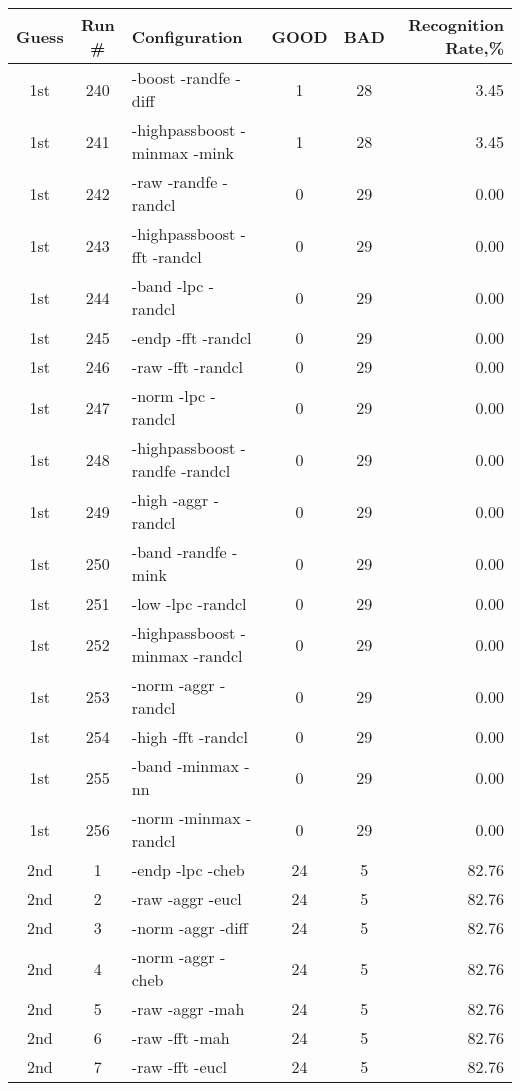 \begin{table}
\begin{minipage}[b]{\textwidth}
\centering
\begin{tabular}{|c|c|l|c|c|r|} \hline
Guess & Run \# & Configuration & GOOD & BAD & Recognition Rate,\%\\ \hline\hline
1st & 240 & -boost -randfe -diff  & 1 & 28 & 3.45\\ \hline
1st & 241 & -highpassboost -minmax -mink  & 1 & 28 & 3.45\\ \hline
1st & 242 & -raw -randfe -randcl  & 0 & 29 & 0.00\\ \hline
1st & 243 & -highpassboost -fft -randcl  & 0 & 29 & 0.00\\ \hline
1st & 244 & -band -lpc -randcl  & 0 & 29 & 0.00\\ \hline
1st & 245 & -endp -fft -randcl  & 0 & 29 & 0.00\\ \hline
1st & 246 & -raw -fft -randcl  & 0 & 29 & 0.00\\ \hline
1st & 247 & -norm -lpc -randcl  & 0 & 29 & 0.00\\ \hline
1st & 248 & -highpassboost -randfe -randcl  & 0 & 29 & 0.00\\ \hline
1st & 249 & -high -aggr -randcl  & 0 & 29 & 0.00\\ \hline
1st & 250 & -band -randfe -mink  & 0 & 29 & 0.00\\ \hline
1st & 251 & -low -lpc -randcl  & 0 & 29 & 0.00\\ \hline
1st & 252 & -highpassboost -minmax -randcl  & 0 & 29 & 0.00\\ \hline
1st & 253 & -norm -aggr -randcl  & 0 & 29 & 0.00\\ \hline
1st & 254 & -high -fft -randcl  & 0 & 29 & 0.00\\ \hline
1st & 255 & -band -minmax -nn  & 0 & 29 & 0.00\\ \hline
1st & 256 & -norm -minmax -randcl  & 0 & 29 & 0.00\\ \hline
2nd & 1 & -endp -lpc -cheb  & 24 & 5 & 82.76\\ \hline
2nd & 2 & -raw -aggr -eucl  & 24 & 5 & 82.76\\ \hline
2nd & 3 & -norm -aggr -diff  & 24 & 5 & 82.76\\ \hline
2nd & 4 & -norm -aggr -cheb  & 24 & 5 & 82.76\\ \hline
2nd & 5 & -raw -aggr -mah  & 24 & 5 & 82.76\\ \hline
2nd & 6 & -raw -fft -mah  & 24 & 5 & 82.76\\ \hline
2nd & 7 & -raw -fft -eucl  & 24 & 5 & 82.76\\ \hline

\end{tabular}
\end{minipage}
\end{table}
